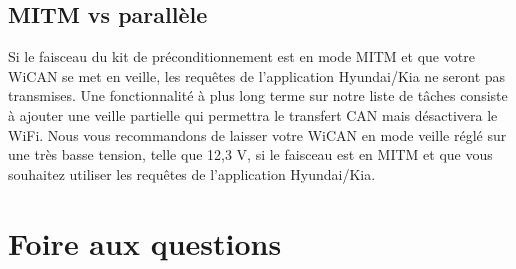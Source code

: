 \documentclass[superscriptaddress,onecolumn,floatfix]{revtex4-2}
\begin{document}
\subsection{MITM vs parallèle}
Si le faisceau du kit de préconditionnement est en mode MITM et que votre WiCAN se met en veille, les requêtes de l'application Hyundai/Kia ne seront pas transmises. Une fonctionnalité à plus long terme sur notre liste de tâches consiste à ajouter une veille partielle qui permettra le transfert CAN mais désactivera le WiFi. Nous vous recommandons de laisser votre WiCAN en mode veille réglé sur une très basse tension, telle que 12,3 V, si le faisceau est en MITM et que vous souhaitez utiliser les requêtes de l'application Hyundai/Kia. 

\section{Foire aux questions}
\end{document}
